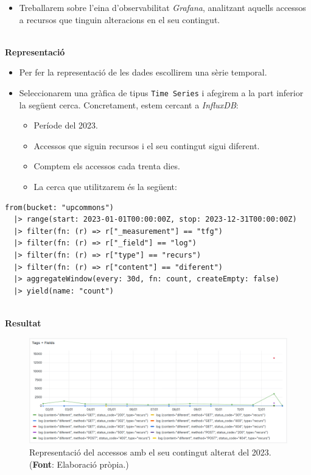 \begin{itemize}
    \item Treballarem sobre l'eina d'observabilitat \textit{Grafana}, analitzant aquells accessos a recursos que tinguin alteracions en el seu contingut.
\end{itemize}

\noindent \\
\textbf{Representació}

\begin{itemize}
    \item Per fer la representació de les dades escollirem una sèrie temporal.
    \item Seleccionarem una gràfica de tipus \texttt{Time Series} i afegirem a la part inferior la següent cerca.
    Concretament, estem cercant a \textit{InfluxDB}:

    \begin{itemize}
        \item Període del 2023.
        \item Accessos que siguin recursos i el seu contingut sigui diferent.
        \item Comptem els accessos cada trenta dies.
        \item La cerca que utilitzarem és la següent:
    \end{itemize}
\end{itemize}

\noindent
\begin{verbatim}
from(bucket: "upcommons")
  |> range(start: 2023-01-01T00:00:00Z, stop: 2023-12-31T00:00:00Z)
  |> filter(fn: (r) => r["_measurement"] == "tfg")
  |> filter(fn: (r) => r["_field"] == "log")
  |> filter(fn: (r) => r["type"] == "recurs")
  |> filter(fn: (r) => r["content"] == "diferent")
  |> aggregateWindow(every: 30d, fn: count, createEmpty: false)
  |> yield(name: "count")
\end{verbatim}

\clearpage

\noindent \\
\textbf{Resultat}

\begin{figure}[htbp]
    \centerline{\includegraphics[width=\textwidth]{figures/possible-attacks}}
    \captionsetup{justification=centering}
    \caption[Representació del accessos amb el seu contingut alterat del 2023.]{Representació del accessos amb el seu contingut alterat del 2023. (\textbf{Font}: Elaboració pròpia.)}\label{fig:log-altered}
\end{figure}

